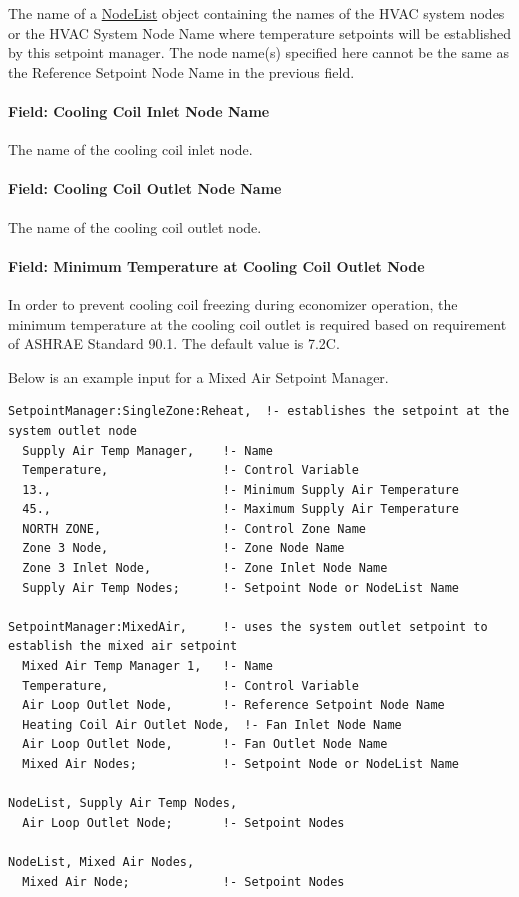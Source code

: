 The name of a \hyperref[nodelist]{NodeList} object containing the names of the HVAC system nodes or the HVAC System Node Name where temperature setpoints will be established by this setpoint manager. The node name(s) specified here cannot be the same as the Reference Setpoint Node Name in the previous field.

\paragraph{Field: Cooling Coil Inlet Node Name}\label{field-cooling-coil-inlet-node-name}

The name of the cooling coil inlet node.

\paragraph{Field: Cooling Coil Outlet Node Name}\label{field-cooling-coil-outlet-node-name}

The name of the cooling coil outlet node.

\paragraph{Field: Minimum Temperature at Cooling Coil Outlet Node}\label{field-minimum-temperature-at-cooling-coil-outlet-node}

In order to prevent cooling coil freezing during economizer operation, the minimum temperature at the cooling coil outlet is required based on requirement of ASHRAE Standard 90.1. The default value is 7.2C.

Below is an example input for a Mixed Air Setpoint Manager.

\begin{lstlisting}
SetpointManager:SingleZone:Reheat,  !- establishes the setpoint at the system outlet node
  Supply Air Temp Manager,    !- Name
  Temperature,                !- Control Variable
  13.,                        !- Minimum Supply Air Temperature
  45.,                        !- Maximum Supply Air Temperature
  NORTH ZONE,                 !- Control Zone Name
  Zone 3 Node,                !- Zone Node Name
  Zone 3 Inlet Node,          !- Zone Inlet Node Name
  Supply Air Temp Nodes;      !- Setpoint Node or NodeList Name

SetpointManager:MixedAir,     !- uses the system outlet setpoint to establish the mixed air setpoint
  Mixed Air Temp Manager 1,   !- Name
  Temperature,                !- Control Variable
  Air Loop Outlet Node,       !- Reference Setpoint Node Name
  Heating Coil Air Outlet Node,  !- Fan Inlet Node Name
  Air Loop Outlet Node,       !- Fan Outlet Node Name
  Mixed Air Nodes;            !- Setpoint Node or NodeList Name

NodeList, Supply Air Temp Nodes,
  Air Loop Outlet Node;       !- Setpoint Nodes

NodeList, Mixed Air Nodes,
  Mixed Air Node;             !- Setpoint Nodes
\end{lstlisting}

